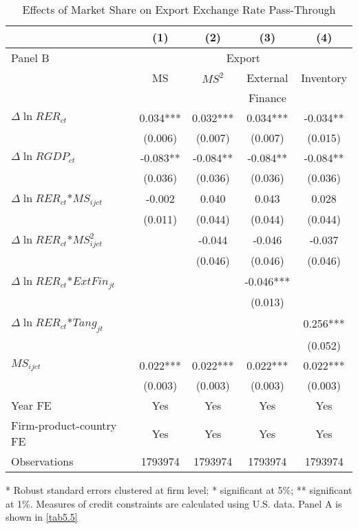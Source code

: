 \begin{table}[htbp]
	\centering
	\caption{Effects of Market Share on Export Exchange Rate Pass-Through}
	\begin{threeparttable}
	\begin{tabular}{lcccc}
		\toprule
		& (1)   & (2)   & (3)   & (4) \\
		\midrule
		Panel B & \multicolumn{4}{c}{Export} \\
		& MS    & $MS^2$ & External & Inventory \\
		&       &       & Finance &  \\
		\midrule
		$\Delta \ln RER_{ct}$ & 0.034*** & 0.032*** & 0.034*** & -0.034** \\
		& (0.006) & (0.007) & (0.007) & (0.015) \\
		$\Delta \ln RGDP_{ct}$ & -0.083** & -0.084** & -0.084** & -0.084** \\
		& (0.036) & (0.036) & (0.036) & (0.036) \\
		$\Delta \ln RER_{ct}$*$MS_{ijct}$ & -0.002 & 0.040 & 0.043 & 0.028 \\
		& (0.011) & (0.044) & (0.044) & (0.044) \\
		$\Delta \ln RER_{ct}$*$MS_{ijct}^2$ &       & -0.044 & -0.046 & -0.037 \\
		&       & (0.046) & (0.046) & (0.046) \\
		$\Delta \ln RER_{ct}$*$ExtFin_{jt}$ &       &       & -0.046*** &  \\
		&       &       & (0.013) &  \\
		$\Delta \ln RER_{ct}$*$Tang_{jt}$ &       &       &       & 0.256*** \\
		&       &       &       & (0.052) \\
		$MS_{ijct}$    & 0.022*** & 0.022*** & 0.022*** & 0.022*** \\
		& (0.003) & (0.003) & (0.003) & (0.003) \\
		Year FE  & Yes   & Yes   & Yes   & Yes \\
		Firm-product-country FE & Yes   & Yes   & Yes   & Yes \\
		Observations & 1793974 & 1793974 & 1793974 & 1793974 \\
		\bottomrule
	    \end{tabular}
    \begin{tablenotes}
    	\footnotesize
    	\item[*] Robust standard errors clustered at firm level; * significant at 5\%; ** significant at 1\%. Measures of credit constraints are calculated using U.S. data. Panel A is shown in \ref{tab5.5}
    \end{tablenotes}
	\end{threeparttable}
	\label{tabA.3}
\end{table}